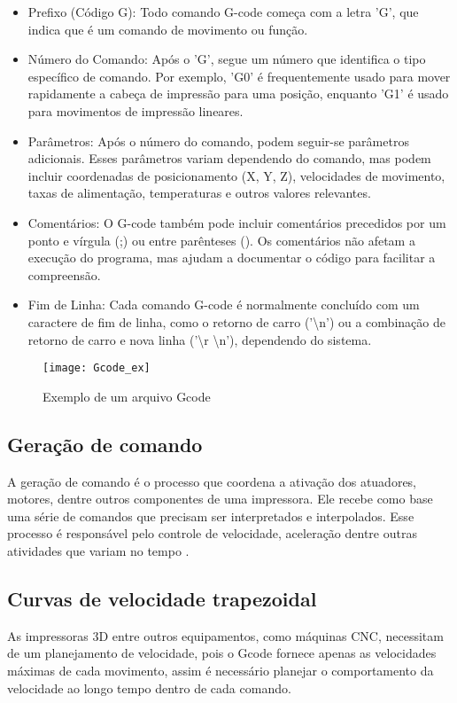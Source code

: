 \begin{itemize}
    \item Prefixo (Código G): Todo comando G-code começa com a letra 'G', que indica que é um comando de movimento ou função.
    \item Número do Comando: Após o 'G', segue um número que identifica o tipo específico de comando. Por exemplo, 'G0' é frequentemente usado para mover rapidamente a cabeça de impressão para uma posição, enquanto 'G1' é usado para movimentos de impressão lineares.
    \item Parâmetros: Após o número do comando, podem seguir-se parâmetros adicionais. Esses parâmetros variam dependendo do comando, mas podem incluir coordenadas de posicionamento (X, Y, Z), velocidades de movimento, taxas de alimentação, temperaturas e outros valores relevantes.
    \item Comentários: O G-code também pode incluir comentários precedidos por um ponto e vírgula (;) ou entre parênteses (). Os comentários não afetam a execução do programa, mas ajudam a documentar o código para facilitar a compreensão.
    \item Fim de Linha: Cada comando G-code é normalmente concluído com um caractere de fim de linha, como o retorno de carro ('\textbackslash n') ou a combinação de retorno de carro e nova linha ('\textbackslash r \textbackslash n'), dependendo do sistema.
\end{itemize}

\begin{figure}[H]
    \centering
    \caption{Exemplo de um arquivo Gcode}
    \texttt{[image: Gcode\_ex]}
    \label{fig:gcode_ex}
\end{figure}

\subsection{Geração de comando}
A geração de comando é o processo que coordena a ativação dos 
atuadores, motores, dentre outros componentes de uma impressora. 
Ele recebe como base uma série de comandos que precisam ser 
interpretados e interpolados. Esse processo é responsável pelo 
controle de velocidade, aceleração dentre outras atividades que 
variam no tempo \cite{yu20}. 

\subsection{Curvas de velocidade trapezoidal}
As impressoras 3D entre outros equipamentos, como máquinas CNC, necessitam
de um planejamento de velocidade, pois o Gcode fornece apenas as velocidades máximas
de cada movimento, assim é necessário planejar o comportamento da velocidade ao longo tempo
dentro de cada comando.

